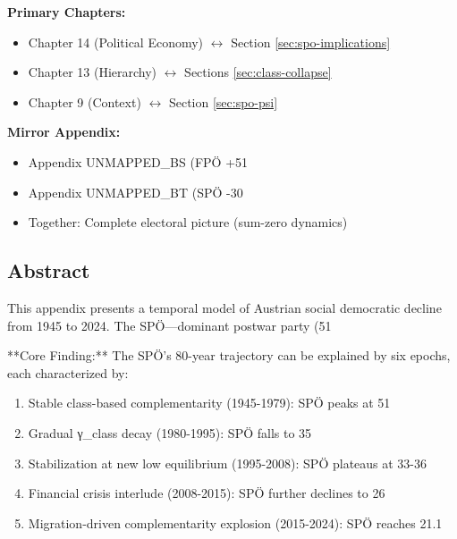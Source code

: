 \begin{tcolorbox}[colback=red!5!white, colframe=red!75!black,
    title=Chapter Linkage]

\textbf{Primary Chapters:}
\begin{itemize}[nosep]
\item Chapter 14 (Political Economy) $\leftrightarrow$ Section \ref{sec:spo-implications}
\item Chapter 13 (Hierarchy) $\leftrightarrow$ Sections \ref{sec:class-collapse}
\item Chapter 9 (Context) $\leftrightarrow$ Section \ref{sec:spo-psi}
\end{itemize}

\textbf{Mirror Appendix:}
\begin{itemize}[nosep]
\item Appendix UNMAPPED_BS (FPÖ +51%
\item Appendix UNMAPPED_BT (SPÖ -30%
\item Together: Complete electoral picture (sum-zero dynamics)
\end{itemize}

\end{tcolorbox}

\clearpage


\subsection*{Abstract}

This appendix presents a temporal model of Austrian social democratic decline from 1945 to 2024. The SPÖ—dominant postwar party (51%

**Core Finding:** The SPÖ's 80-year trajectory can be explained by six epochs, each characterized by:

\begin{enumerate}
\item Stable class-based complementarity (1945-1979): SPÖ peaks at 51%
\item Gradual γ_class decay (1980-1995): SPÖ falls to 35%
\item Stabilization at new low equilibrium (1995-2008): SPÖ plateaus at 33-36%
\item Financial crisis interlude (2008-2015): SPÖ further declines to 26%
\item Migration-driven complementarity explosion (2015-2024): SPÖ reaches 21.1%
\end{enumerate}


